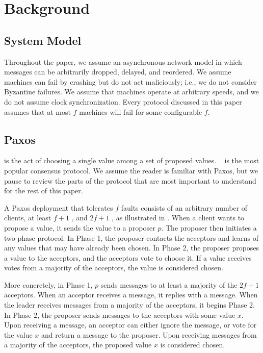 \section{Background}

\subsection{System Model}
Throughout the paper, we assume an asynchronous network model in which messages
can be arbitrarily dropped, delayed, and reordered. We assume machines can fail
by crashing but do not act maliciously; i.e., we do not consider Byzantine
failures. We assume that machines operate at arbitrary speeds, and we do not
assume clock synchronization. Every protocol discussed in this paper assumes
that at most $f$ machines will fail for some configurable $f$.

\subsection{Paxos}
 is the act of choosing a single value among a set of
proposed values. ~\cite{lamport1998part} is the most popular
consensus protocol. We assume the reader is familiar with Paxos, but we pause
to review the parts of the protocol that are most important to understand for
the rest of this paper.

A Paxos deployment that tolerates $f$ faults consists of an arbitrary number of
clients, at least $f+1$ , and $2f+1$ , as
illustrated in . When a client wants to propose
a value, it sends the value to a proposer $p$. The proposer then initiates a
two-phase protocol. In Phase 1, the proposer contacts the acceptors and learns
of any values that may have already been chosen. In Phase 2, the proposer
proposes a value to the acceptors, and the acceptors vote to choose it. If a
value receives votes from a majority of the acceptors, the value is considered
chosen.

More concretely, in Phase 1, $p$ sends  messages to at least a
majority of the $2f+1$ acceptors. When an acceptor receives a 
message, it replies with a  message. When the leader receives
 messages from a majority of the acceptors, it begins Phase 2.
%
In Phase 2, the proposer sends  messages to the acceptors with
some value $x$. Upon receiving a  message, an acceptor can
either ignore the message, or vote for the value $x$ and return a
 message to the proposer. Upon receiving 
messages from a majority of the acceptors, the proposed value $x$ is considered
chosen.


